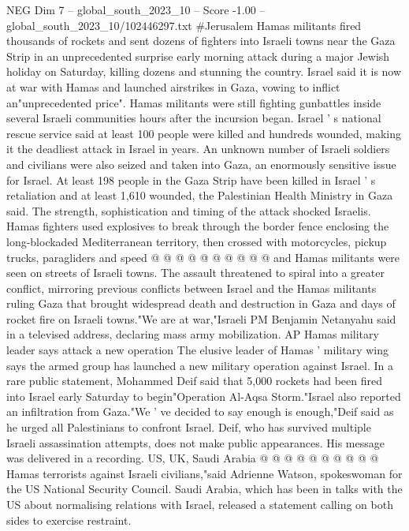 \begin{textsample}{NEG Dim 7 – global\_south\_2023\_10 – Score -1.00 – global\_south\_2023\_10/102446297.txt}  \label{ex:f7_neg_067}
\#Jerusalem Hamas militants fired thousands of rockets and sent dozens of fighters into Israeli towns near the Gaza Strip in an unprecedented surprise early morning attack during a major Jewish holiday on Saturday, killing dozens and stunning the country.
Israel said it is now at war with Hamas and launched airstrikes in Gaza, vowing to inflict an"unprecedented price".
Hamas militants were still fighting gunbattles inside several Israeli communities hours after the incursion began.
Israel ' s national rescue service said at least 100 people were killed and hundreds wounded, making it the deadliest attack in Israel in years.
An unknown number of Israeli soldiers and civilians were also seized and taken into Gaza, an enormously sensitive issue for Israel.
At least 198 people in the Gaza Strip have been killed in Israel ' s retaliation and at least 1,610 wounded, the Palestinian Health Ministry in Gaza said.
The strength, sophistication and timing of the attack shocked Israelis.
Hamas fighters used explosives to break through the border fence enclosing the long-blockaded Mediterranean territory, then crossed with motorcycles, pickup trucks, paragliders and speed @ @ @ @ @ @ @ @ @ @ and Hamas militants were seen on streets of Israeli towns.
The assault threatened to spiral into a greater conflict, mirroring previous conflicts between Israel and the Hamas militants ruling Gaza that brought widespread death and destruction in Gaza and days of rocket fire on Israeli towns."We are at war,"Israeli PM Benjamin Netanyahu said in a televised address, declaring mass army mobilization.
AP Hamas military leader says attack a new operation The elusive leader of Hamas ' military wing says the armed group has launched a new military operation against Israel.
In a rare public statement, Mohammed Deif said that 5,000 rockets had been fired into Israel early Saturday to begin"Operation Al-Aqsa Storm."Israel also reported an infiltration from Gaza."We ' ve decided to say enough is enough,"Deif said as he urged all Palestinians to confront Israel.
Deif, who has survived multiple Israeli assassination attempts, does not make public appearances.
His message was delivered in a recording.
US, UK, Saudi Arabia @ @ @ @ @ @ @ @ @ @ Hamas terrorists against Israeli civilians,"said Adrienne Watson, spokeswoman for the US National Security Council.
Saudi Arabia, which has been in talks with the US about normalising relations with Israel, released a statement calling on both sides to exercise restraint.

\end{textsample}
